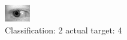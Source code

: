\begin{figure}[h!]
\begin{center}
\includegraphics[width=0.60\columnwidth]{figures/ID795_class_2_target_4.png}
\end{center}
\caption{ Classification: 2 actual target: 4}
\label{fig:ID795_class_2_target_4}
\end{figure}
